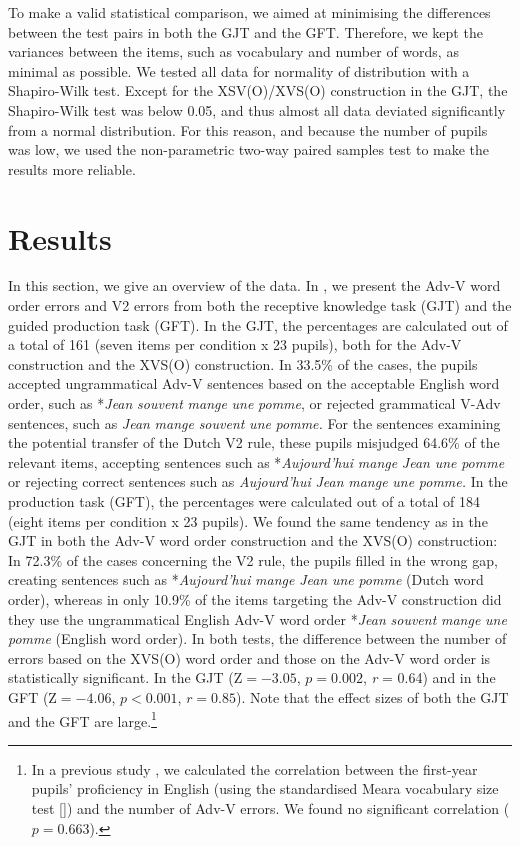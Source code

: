 \documentclass[output=paper]{langsci/langscibook}
\begin{document}
To make a valid statistical comparison, we aimed at minimising the differences between the test pairs in both the GJT and the GFT. Therefore, we kept the variances between the items, such as vocabulary and number of words, as minimal as possible. We tested all data for normality of distribution with a Shapiro-Wilk test. Except for the XSV(O)/XVS(O) construction in the GJT, the Shapiro-Wilk test was below 0.05, and thus almost all data deviated significantly from a normal distribution. For this reason, and because the number of pupils was low, we used the non-parametric two-way paired samples test to make the results more reliable.

\section{Results}
\label{sec:stadt:4}

In this section, we give an overview of the data. In , we present the Adv-V word order errors and V2 errors from both the receptive knowledge task (GJT) and the guided production task (GFT). In the GJT, the percentages are calculated out of a total of 161 (seven items per condition x 23 pupils), both for the Adv-V construction and the XVS(O) construction. In 33.5\% of the cases, the pupils accepted ungrammatical Adv-V sentences based on the acceptable English word order, such as *\textit{Jean} \textit{souvent} \textit{mange} \textit{une} \textit{pomme}, or rejected grammatical V-Adv sentences, such as \textit{Jean} \textit{mange} \textit{souvent} \textit{une} \textit{pomme.} For the sentences examining the potential transfer of the Dutch V2 rule, these pupils misjudged 64.6\% of the relevant items, accepting sentences such as *\textit{Aujourd’hui} \textit{mange} \textit{Jean} \textit{une} \textit{pomme} or rejecting correct sentences such as \textit{Aujourd’hui} \textit{Jean} \textit{mange} \textit{une} \textit{pomme.} In the production task (GFT), the percentages were calculated out of a total of 184 (eight items per condition x 23 pupils). We found the same tendency as in the GJT in both the Adv-V word order construction and the XVS(O) construction: In 72.3\% of the cases concerning the V2 rule, the pupils filled in the wrong gap, creating sentences such as *\textit{Aujourd’hui} \textit{mange} \textit{Jean} \textit{une} \textit{pomme} (Dutch word order), whereas in only 10.9\% of the items targeting the Adv-V construction did they use the ungrammatical English Adv-V word order *\textit{Jean} \textit{souvent} \textit{mange} \textit{une} \textit{pomme} (English word order). In both tests, the difference between the number of errors based on the XVS(O) word order and those on the Adv-V word order is statistically significant. In the GJT ($\text{Z} = -3.05$, $p = 0.002$, \textit{r} = 0.64) and in the GFT ($\text{Z} = -4.06$, $p < 0.001$, $r = 0.85$). Note that the effect sizes of both the GJT and the GFT are large.\footnote{In a previous study \citep{StadtEtAl2018Longitudinal}, we calculated the correlation between the first-year pupils’ proficiency in English (using the standardised Meara vocabulary size test [\citealt{Meara2010}]) and the number of Adv-V errors. We found no significant correlation ($p = 0.663$).}
\end{document}
